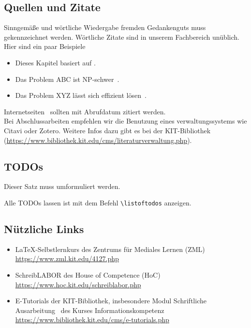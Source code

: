 \documentclass[12pt,a4paper,twoside]{article}
\theoremstyle{definition}
\numberwithin{equation}{section}
\begin{document}
\subsection{Quellen und Zitate}

Sinngemäße und wörtliche Wiedergabe fremden Gedankenguts muss gekennzeichnet werden. Wörtliche Zitate sind in unserem Fachbereich unüblich. Hier sind ein paar Beispiele

\begin{itemize}
	\item Dieses Kapitel basiert auf \cite{nickelor}.
	\item Das Problem ABC ist NP-schwer~\cite{melofl}.
	\item Das Problem XYZ lässt sich effizient lösen~\cite[Algorithmus 1]{melofl}.
\end{itemize}
Internetseiten~\cite{dash} sollten mit Abrufdatum zitiert werden.\\

Bei Abschlussarbeiten empfehlen wir die Benutzung eines verwaltungssystems wie Citavi oder Zotero. Weitere Infos dazu gibt es bei der KIT-Bibliothek (\url{https://www.bibliothek.kit.edu/cms/literaturverwaltung.php}).

\subsection{TODOs}

Dieser Satz muss umformuliert werden.\\


Alle TODOs lassen ist mit dem Befehl \verb|\listoftodos| anzeigen.

\subsection{Nützliche Links}

\begin{itemize}
	\item \LaTeX-Selbstlernkurs des Zentrums für Mediales Lernen (ZML)\\ 		
		\url{https://www.zml.kit.edu/4127.php}
	\item SchreibLABOR des House of Competence (HoC)\\
		\url{https://www.hoc.kit.edu/schreiblabor.php}
	\item E-Tutorials der KIT-Bibliothek, insbesondere Modul \grqq Schriftliche Ausarbeitung\glqq~ des Kurses \grqq Informationskompetenz\glqq \\
		\url{https://www.bibliothek.kit.edu/cms/e-tutorials.php}
\end{itemize}
\end{document}
